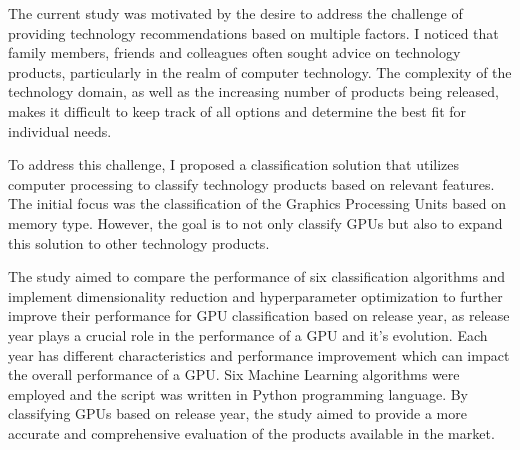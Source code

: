 \documentclass[conference,onecolumn]{IEEEtran}
\begin{document}
The current study was motivated by the desire to address the challenge of providing technology recommendations based on multiple factors. I noticed that family members, friends and colleagues often sought advice on technology products, particularly in the realm of computer technology. The complexity of the technology domain, as well as the increasing number of products being released, makes it difficult to keep track of all options and determine the best fit for individual needs.

To address this challenge, I proposed a classification solution that utilizes computer processing to classify technology products based on relevant features. The initial focus was the classification of the Graphics Processing Units based on memory type. However, the goal is to not only classify GPUs but also to expand this solution to other technology products.

The study aimed to compare the performance of six classification algorithms and implement dimensionality reduction and hyperparameter optimization to further improve their performance for GPU classification based on release year, as release year plays a crucial role in the performance of a GPU and it's evolution. Each year has different characteristics and performance improvement which can impact the overall performance of a GPU. Six Machine Learning algorithms were employed and the script was written in Python programming language. By classifying GPUs based on release year, the study aimed to provide a more accurate and comprehensive evaluation of the products available in the market.

\end{document}
